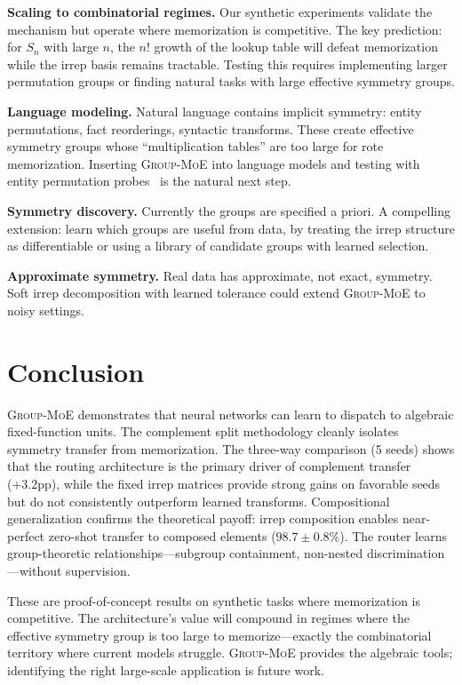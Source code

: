 \documentclass[10pt, letterpaper]{article}
\newcommand{\gmoe}{\textsc{Group-MoE}}
\begin{document}
\textbf{Scaling to combinatorial regimes.} Our synthetic experiments validate the mechanism but operate where memorization is competitive. The key prediction: for $S_n$ with large $n$, the $n!$ growth of the lookup table will defeat memorization while the irrep basis remains tractable. Testing this requires implementing larger permutation groups or finding natural tasks with large effective symmetry groups.

\textbf{Language modeling.} Natural language contains implicit symmetry: entity permutations, fact reorderings, syntactic transforms. These create effective symmetry groups whose ``multiplication tables'' are too large for rote memorization. Inserting \gmoe{} into language models and testing with entity permutation probes~\cite{walters2025ordering} is the natural next step.

\textbf{Symmetry discovery.} Currently the groups are specified a priori. A compelling extension: learn which groups are useful from data, by treating the irrep structure as differentiable or using a library of candidate groups with learned selection.

\textbf{Approximate symmetry.} Real data has approximate, not exact, symmetry. Soft irrep decomposition with learned tolerance could extend \gmoe{} to noisy settings.

\section{Conclusion}
\label{sec:conclusion}

\gmoe{} demonstrates that neural networks can learn to dispatch to algebraic fixed-function units. The complement split methodology cleanly isolates symmetry transfer from memorization. The three-way comparison (5 seeds) shows that the routing architecture is the primary driver of complement transfer (+3.2pp), while the fixed irrep matrices provide strong gains on favorable seeds but do not consistently outperform learned transforms. Compositional generalization confirms the theoretical payoff: irrep composition enables near-perfect zero-shot transfer to composed elements ($98.7 \pm 0.8$\%). The router learns group-theoretic relationships---subgroup containment, non-nested discrimination---without supervision.

These are proof-of-concept results on synthetic tasks where memorization is competitive. The architecture's value will compound in regimes where the effective symmetry group is too large to memorize---exactly the combinatorial territory where current models struggle. \gmoe{} provides the algebraic tools; identifying the right large-scale application is future work.
\end{document}
